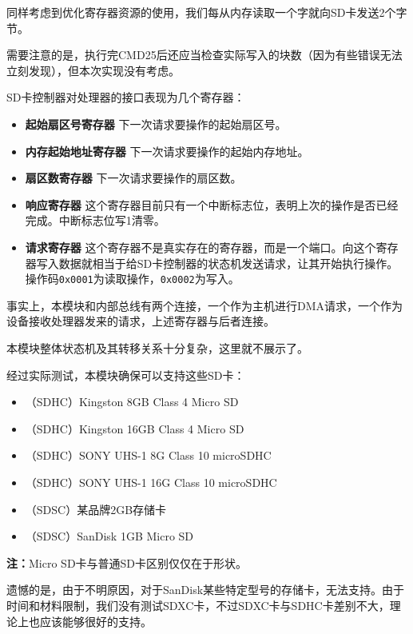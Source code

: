 \documentclass[11pt,utf8]{report}
\begin{document}
	\par 同样考虑到优化寄存器资源的使用，我们每从内存读取一个字就向SD卡发送2个字节。
	
	\par 需要注意的是，执行完CMD25后还应当检查实际写入的块数（因为有些错误无法立刻发现），但本次实现没有考虑。
	
	\par SD卡控制器对处理器的接口表现为几个寄存器：
	\begin{itemize}
		\item \textbf{起始扇区号寄存器} 下一次请求要操作的起始扇区号。
		\item \textbf{内存起始地址寄存器} 下一次请求要操作的起始内存地址。
		\item \textbf{扇区数寄存器} 下一次请求要操作的扇区数。
		\item \textbf{响应寄存器} 这个寄存器目前只有一个中断标志位，表明上次的操作是否已经完成。中断标志位写1清零。
		\item \textbf{请求寄存器} 这个寄存器不是真实存在的寄存器，而是一个端口。向这个寄存器写入数据就相当于给SD卡控制器的状态机发送请求，让其开始执行操作。操作码\texttt{0x0001}为读取操作，\texttt{0x0002}为写入。
	\end{itemize}
	\par 事实上，本模块和内部总线有两个连接，一个作为主机进行DMA请求，一个作为设备接收处理器发来的请求，上述寄存器与后者连接。
	
	\par 本模块整体状态机及其转移关系十分复杂，这里就不展示了。
	
	\par 经过实际测试，本模块确保可以支持这些SD卡：
	
	\begin{itemize}
		\item （SDHC）Kingston 8GB Class 4 Micro SD
		\item （SDHC）Kingston 16GB Class 4 Micro SD
		\item （SDHC）SONY UHS-1 8G Class 10 microSDHC
		\item （SDHC）SONY UHS-1 16G Class 10 microSDHC
		\item （SDSC）某品牌2GB存储卡
		\item （SDSC）SanDisk 1GB Micro SD
	\end{itemize}
	
	\par \textbf{注：}Micro SD卡与普通SD卡区别仅仅在于形状。
	
	\par 遗憾的是，由于不明原因，对于SanDisk某些特定型号的存储卡，无法支持。由于时间和材料限制，我们没有测试SDXC卡，不过SDXC卡与SDHC卡差别不大，理论上也应该能够很好的支持。
	
\end{document}
